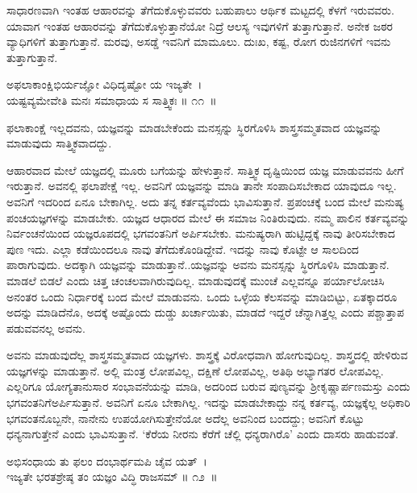 ಸಾಧಾರಣವಾಗಿ ಇಂತಹ ಆಹಾರವನ್ನು ತೆಗೆದುಕೊಳ್ಳುವವರು ಬಹುಪಾಲು ಆರ್ಥಿಕ ಮಟ್ಟದಲ್ಲಿ ಕೆಳಗೆ ಇರುವವರು. ಯಾವಾಗ ಇಂತಹ ಆಹಾರವನ್ನು ತೆಗೆದುಕೊಳ್ಳುತ್ತಾನೆಯೋ ನಿದ್ರೆ ಆಲಸ್ಯ ಇವುಗಳಿಗೆ ತುತ್ತಾಗುತ್ತಾನೆ. ಅನೇಕ ಜಠರ ವ್ಯಾಧಿಗಳಿಗೆ ತುತ್ತಾಗುತ್ತಾನೆ. ಮರವು, ಅಸಡ್ಡೆ ಇವನಿಗೆ ಮಾಮೂಲು. ದುಃಖ, ಕಷ್ಟ, ರೋಗ ರುಜಿನಗಳಿಗೆ ಇವನು ತುತ್ತಾಗುತ್ತಾನೆ.

\begin{shloka}
ಅಫಲಾಕಾಂಕ್ಷಿಭಿರ್ಯಜ್ಞೋ ವಿಧಿದೃಷ್ಟೋ ಯ ಇಜ್ಯತೇ~।\\ಯಷ್ಟವ್ಯಮೇವೇತಿ ಮನಃ ಸಮಾಧಾಯ ಸ ಸಾತ್ತ್ವಿಕಃ \hfill॥ ೧೧~॥
\end{shloka}

\begin{artha}
ಫಲಾಕಾಂಕ್ಷೆ ಇಲ್ಲದವನು, ಯಜ್ಞವನ್ನು ಮಾಡಬೇಕೆಂದು ಮನಸ್ಸನ್ನು ಸ್ಥಿರಗೊಳಿಸಿ ಶಾಸ್ತ್ರಸಮ್ಮತವಾದ ಯಜ್ಞವನ್ನು ಮಾಡುವುದು ಸಾತ್ತ್ವಿಕವಾದದ್ದು.
\end{artha}

ಆಹಾರವಾದ ಮೇಲೆ ಯಜ್ಞದಲ್ಲಿ ಮೂರು ಬಗೆಯನ್ನು ಹೇಳುತ್ತಾನೆ. ಸಾತ್ತ್ವಿಕ ದೃಷ್ಟಿಯಿಂದ ಯಜ್ಞ ಮಾಡುವವನು ಹೀಗೆ ಇರುತ್ತಾನೆ. ಅವನಲ್ಲಿ ಫಲಾಪೇಕ್ಷೆ ಇಲ್ಲ. ಅವನಿಗೆ ಯಜ್ಞವನ್ನು ಮಾಡಿ ತಾನೇ ಸಂಪಾದಿಸಬೇಕಾದ ಯಾವುದೂ ಇಲ್ಲ. ಅವನಿಗೆ ಇದರಿಂದ ಏನೂ ಬೇಕಾಗಿಲ್ಲ. ಅದು ತನ್ನ ಕರ್ತವ್ಯವೆಂದು ಭಾವಿಸುತ್ತಾನೆ. ಪ್ರಪಂಚಕ್ಕೆ ಬಂದ ಮೇಲೆ ಮನುಷ್ಯ ಪಂಚಯಜ್ಞಗಳನ್ನು ಮಾಡಬೇಕು. ಯಜ್ಞದ ಆಧಾರದ ಮೇಲೆ ಈ ಸಮಾಜ ನಿಂತಿರುವುದು. ನಮ್ಮ ಪಾಲಿನ ಕರ್ತವ್ಯವನ್ನು ನಿರ್ವಂಚನೆಯಿಂದ ಯಜ್ಞರೂಪದಲ್ಲಿ ಭಗವಂತನಿಗೆ ಅರ್ಪಿಸಬೇಕು. ಮನುಷ್ಯರಾಗಿ ಹುಟ್ಟಿದ್ದಕ್ಕೆ ನಾವು ತೀರಿಸಬೇಕಾದ ಪುಣ ಇದು. ಎಲ್ಲಾ ಕಡೆಯಿಂದಲೂ ನಾವು ತೆಗೆದುಕೊಂಡಿದ್ದೇವೆ. ಇದನ್ನು ನಾವು ಕೊಟ್ಟೇ ಆ ಸಾಲದಿಂದ ಪಾರಾಗುವುದು. ಅದಕ್ಕಾಗಿ ಯಜ್ಞವನ್ನು ಮಾಡುತ್ತಾನೆ..ಯಜ್ಞವನ್ನು ಅವನು ಮನಸ್ಸನ್ನು ಸ್ಥಿರಗೊಳಿಸಿ ಮಾಡುತ್ತಾನೆ. ಮಾಡಲೆ ಬಿಡಲೆ ಎಂದು ಚಿತ್ತ ಚಂಚಲವಾಗಿರುವುದಿಲ್ಲ. ಮಾಡುವುದಕ್ಕೆ ಮುಂಚೆ ಎಲ್ಲವನ್ನೂ ಪರ್ಯಾಲೋಚಿಸಿ ಅನಂತರ ಒಂದು ನಿರ್ಧಾರಕ್ಕೆ ಬಂದ ಮೇಲೆ ಮಾಡುವನು. ಒಂದು ಒಳ್ಳೆಯ ಕೆಲಸವನ್ನು ಮಾಡಿಬಿಟ್ಟು, ಏತಕ್ಕಾದರೂ ಅದನ್ನು ಮಾಡಿದೆನೊ, ಅದಕ್ಕೆ ಅಷ್ಟೊಂದು ದುಡ್ಡು ಖರ್ಚಾಯಿತು, ಮಾಡದೆ ಇದ್ದರೆ ಚೆನ್ನಾಗಿತ್ತಲ್ಲ ಎಂದು ಪಶ್ಚಾತ್ತಾಪ ಪಡುವವನಲ್ಲ ಅವನು.

ಅವನು ಮಾಡುವುದೆಲ್ಲ ಶಾಸ್ತ್ರಸಮ್ಮತವಾದ ಯಜ್ಞಗಳು. ಶಾಸ್ತ್ರಕ್ಕೆ ವಿರೋಧವಾಗಿ ಹೋಗುವು\-ದಿಲ್ಲ. ಶಾಸ್ತ್ರದಲ್ಲಿ ಹೇಳಿರುವ ಯಜ್ಞಗಳನ್ನು ಮಾಡುತ್ತಾನೆ. ಅಲ್ಲಿ ಮಂತ್ರ ಲೋಪವಿಲ್ಲ, ದಕ್ಷಿಣೆ ಲೋಪವಿಲ್ಲ, ಅತಿಥಿ ಅಭ್ಯಾಗತರ ಲೋಪವಿಲ್ಲ. ಎಲ್ಲರಿಗೂ ಯೋಗ್ಯತಾನುಸಾರ ಸಂಭಾವನೆಯನ್ನು ಮಾಡಿ, ಅದರಿಂದ ಬರುವ ಪುಣ್ಯವನ್ನು ಶ‍್ರೀಕೃಷ್ಣಾರ್ಪಣಮಸ್ತು ಎಂದು ಭಗವಂತನಿಗೆ\break ಅರ್ಪಿಸುತ್ತಾನೆ. ಅವನಿಗೆ ಏನೂ ಬೇಕಾಗಿಲ್ಲ. ಇದನ್ನು ಮಾಡಬೇಕಾದ್ದು ನನ್ನ ಕರ್ತವ್ಯ, ಯಜ್ಞಕ್ಕೆಲ್ಲ ಅಧಿಕಾರಿ ಭಗವಂತನೊಬ್ಬನೇ, ನಾನೇನು ಉಪಯೋಗಿಸುತ್ತೇನೆಯೋ ಅದೆಲ್ಲ ಅವನಿಂದ ಬಂದದ್ದು; ಅವನಿಗೆ ಕೊಟ್ಟು ಧನ್ಯನಾಗುತ್ತೇನೆ ಎಂದು ಭಾವಿಸುತ್ತಾನೆ. ‘ಕೆರೆಯ ನೀರನು ಕೆರೆಗೆ ಚೆಲ್ಲಿ ಧನ್ಯರಾಗಿರೊ’ ಎಂದು ದಾಸರು ಹಾಡುವಂತೆ.

\begin{shloka}
ಅಭಿಸಂಧಾಯ ತು ಫಲಂ ದಂಭಾರ್ಥಮಪಿ ಚೈವ ಯತ್~।\\ಇಜ್ಯತೇ ಭರತಶ್ರೇಷ್ಠ ತಂ ಯಜ್ಞಂ ವಿದ್ಧಿ ರಾಜಸಮ್ \hfill॥ ೧೨~॥
\end{shloka}

